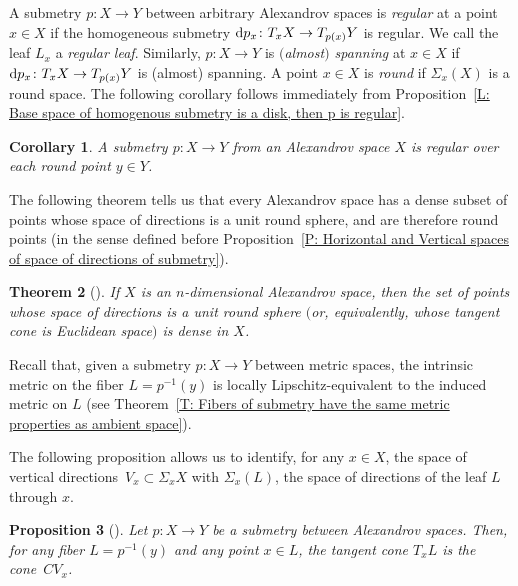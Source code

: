 \documentclass[10pt,a4paper]{amsart}
\numberwithin{equation}{section}
\newtheorem{thm}{Theorem}[section]
\newtheorem{cor}[thm]{Corollary}
\newtheorem{prop}[thm]{Proposition}
\theoremstyle{definition}
\begin{document}
A submetry $p\colon X\to Y$ between arbitrary Alexandrov spaces is \emph{regular} at a point $x\in X$ if the homogeneous submetry ${\rm d}p_x\colon T_xX \to T_{p(x)}Y$ is regular. We call the leaf $L_x$ a \emph{regular leaf}. Similarly, $p\colon X\to Y$ is \emph{$($almost$)$ spanning} at $x\in X$ if ${\rm d}p_x\colon T_xX \to T_{p(x)}Y$ is (almost) spanning. A point $x\in X$ is \emph{round} if $\Sigma_x(X)$ is a round space. The following corollary follows immediately from Proposition~\ref{L: Base space of homogenous submetry is a disk, then p is regular}.

\begin{cor}\label{L: submetry over a manifold point is regular}
A submetry $p\colon X \to Y$ from an Alexandrov space $X$ is regular over each round point $y\in Y$.
\end{cor}



The following theorem tells us that every Alexandrov space has a dense subset of points whose space of directions is a unit round sphere, and are therefore round points (in the sense defined before Proposition~\ref{P: Horizontal and Vertical spaces of space of directions of submetry}).



\begin{thm}[]
\label{T:geometrically.regular.points.are.dense}
If $X$ is an $n$-dimensional Alexandrov space, then
the set of points whose space of directions is a unit round sphere $($or, equivalently, whose tangent cone is Euclidean space$)$ is dense in $X$.
\end{thm}


Recall that, given a submetry $p\colon X\to Y$ between metric spaces, the intrinsic metric on the fiber $L = p^{-1}(y)$ is locally Lipschitz-equivalent to the induced metric on $L$ (see Theorem~\ref{T: Fibers of submetry have the same metric properties as ambient space}).


The following proposition allows us to identify, for any $x\in X$, the space of vertical directions~${V_x\subset \Sigma_xX}$ with $\Sigma_x(L)$, the space of di\-rections of the leaf $L$ through $x$.



\begin{prop}[]
\label{P: Tangent space to leaf is cone of vertical space}
Let $p\colon X\to Y$ be a submetry between Alexandrov spaces. Then, for any fiber $L = p^{-1}(y)$ and any point $x\in L$, the tangent cone $T_x L $ is the cone~$CV_x$.
\end{prop}
\end{document}
